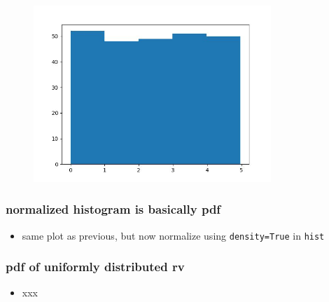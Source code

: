 \documentclass[english,14pt]{beamer}
\begin{document}

\begin{frame}[fragile]

\frametitle{}

\begin{figure}[ht]
	\centering
	\includegraphics[width=0.8\textwidth]{figures/uniformOutput}
\end{figure}

\end{frame}


\begin{frame}[fragile]

\frametitle{normalized histogram is basically pdf}

\begin{itemize}
	\item same plot as previous, but now normalize using \texttt{density=True} in \texttt{hist}
\end{itemize}

\end{frame}


\begin{frame}[fragile]

\frametitle{pdf of uniformly distributed rv}

\begin{itemize}
	\item xxx
\end{itemize}

\end{frame}
\end{document}
